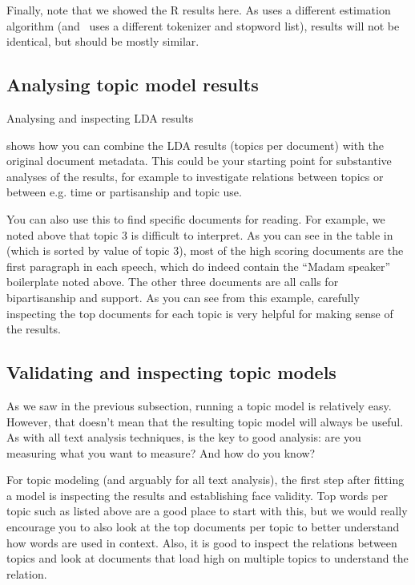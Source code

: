 Finally, note that we showed the R results here. As  uses a different estimation algorithm
(and \sklearn\ uses a different tokenizer and stopword list), results will not be identical,
but should be mostly similar. 

\subsection{Analysing topic model results}

\begin{ccsexample}
\caption{Analysing and inspecting LDA results}\label{ex:ldaresults}
\end{ccsexample}


 shows how you can combine the LDA results (topics per document)
with the original document metadata.
This could be your starting point for substantive analyses of the results,
for example to investigate relations between topics or between e.g. time or partisanship and topic use.

You can also use this to find specific documents for reading.
For example, we noted above that topic 3 is difficult to interpret.
As you can see in the table in  (which is sorted by value of topic 3),
most of the high scoring documents are the first paragraph in each speech,
which do indeed contain the ``Madam speaker'' boilerplate noted above.
The other three documents are all calls for bipartisanship and support.
As you can see from this example, carefully inspecting the top documents for each topic
is very helpful for making sense of the results.


\subsection{Validating and inspecting topic models}

As we saw in the previous subsection, running a topic model is relatively easy.
However, that doesn't mean that the resulting topic model will always be useful.
As with all text analysis techniques,  is the key to good analysis:
are you measuring what you want to measure? And how do you know?

For topic modeling (and arguably for all text analysis),
the first step after fitting a model is inspecting the results and establishing face validity.
Top words per topic such as listed above are a good place to start with this,
but we would really encourage you to also look at the top documents per topic to better understand how words are used in context.
Also, it is good to inspect the relations between topics and look at documents that load high on multiple topics to understand the relation.

